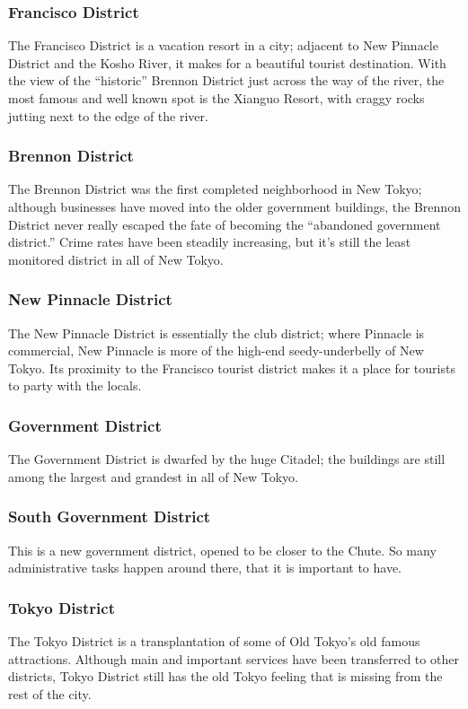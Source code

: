 \documentclass{article}
\begin{document}
\subsubsection{Francisco District}
The Francisco District is a vacation resort in a city; adjacent to New Pinnacle
District and the Kosho River, it makes for a beautiful tourist destination.
With the view of the “historic” Brennon District just across the way of the
river, the most famous and well known spot is the Xianguo Resort, with craggy
rocks jutting next to the edge of the river.
\subsubsection{Brennon District}
The Brennon District was the first completed neighborhood in New Tokyo; although
businesses have moved into the older government buildings, the Brennon District
never really escaped the fate of becoming the “abandoned government district.”
Crime rates have been steadily increasing, but it’s still the least monitored
district in all of New Tokyo.
\subsubsection{New Pinnacle District}
The New Pinnacle District is essentially the club district; where Pinnacle is
commercial, New Pinnacle is more of the high-end seedy-underbelly of New Tokyo.
Its proximity to the Francisco tourist district makes it a place for tourists
to party with the locals.
\subsubsection{Government District}
The Government District is dwarfed by the huge Citadel; the buildings are still
among the largest and grandest in all of New Tokyo.
\subsubsection{South Government District}
This is a new government district, opened to be closer to the Chute. So many
administrative tasks happen around there, that it is important to have.
\subsubsection{Tokyo District}
The Tokyo District is a transplantation of some of Old Tokyo’s old famous
attractions. Although main and important services have been transferred to
other districts, Tokyo District still has the old Tokyo feeling that is missing
from the rest of the city.
\end{document}
